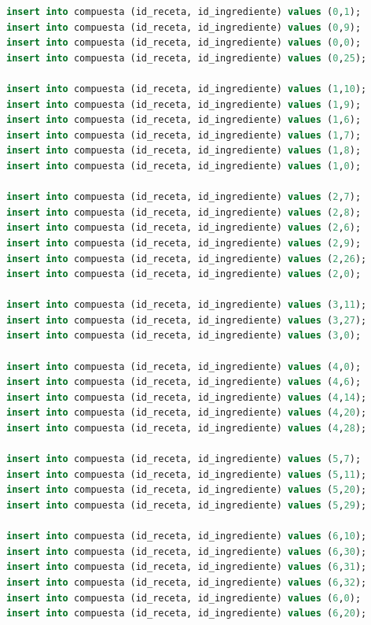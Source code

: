 \documentclass[12pt,letterpaper]{article}
\begin{document}
\begin{lstlisting}[language=sql]
insert into compuesta (id_receta, id_ingrediente) values (0,1);
insert into compuesta (id_receta, id_ingrediente) values (0,9);
insert into compuesta (id_receta, id_ingrediente) values (0,0);
insert into compuesta (id_receta, id_ingrediente) values (0,25);

insert into compuesta (id_receta, id_ingrediente) values (1,10);
insert into compuesta (id_receta, id_ingrediente) values (1,9);
insert into compuesta (id_receta, id_ingrediente) values (1,6);
insert into compuesta (id_receta, id_ingrediente) values (1,7);
insert into compuesta (id_receta, id_ingrediente) values (1,8);
insert into compuesta (id_receta, id_ingrediente) values (1,0);

insert into compuesta (id_receta, id_ingrediente) values (2,7);
insert into compuesta (id_receta, id_ingrediente) values (2,8);
insert into compuesta (id_receta, id_ingrediente) values (2,6);
insert into compuesta (id_receta, id_ingrediente) values (2,9);
insert into compuesta (id_receta, id_ingrediente) values (2,26);
insert into compuesta (id_receta, id_ingrediente) values (2,0);

insert into compuesta (id_receta, id_ingrediente) values (3,11);
insert into compuesta (id_receta, id_ingrediente) values (3,27);
insert into compuesta (id_receta, id_ingrediente) values (3,0);

insert into compuesta (id_receta, id_ingrediente) values (4,0);
insert into compuesta (id_receta, id_ingrediente) values (4,6);
insert into compuesta (id_receta, id_ingrediente) values (4,14);
insert into compuesta (id_receta, id_ingrediente) values (4,20);
insert into compuesta (id_receta, id_ingrediente) values (4,28);

insert into compuesta (id_receta, id_ingrediente) values (5,7);
insert into compuesta (id_receta, id_ingrediente) values (5,11);
insert into compuesta (id_receta, id_ingrediente) values (5,20);
insert into compuesta (id_receta, id_ingrediente) values (5,29);

insert into compuesta (id_receta, id_ingrediente) values (6,10);
insert into compuesta (id_receta, id_ingrediente) values (6,30);
insert into compuesta (id_receta, id_ingrediente) values (6,31);
insert into compuesta (id_receta, id_ingrediente) values (6,32);
insert into compuesta (id_receta, id_ingrediente) values (6,0);
insert into compuesta (id_receta, id_ingrediente) values (6,20);

\end{lstlisting}
\end{document}
